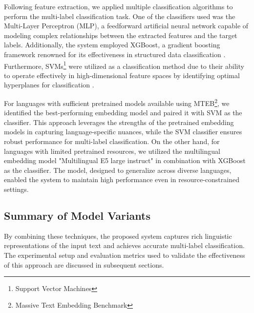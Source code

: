 Following feature extraction, we applied multiple classification algorithms to perform the multi-label classification task. One of the classifiers used was the Multi-Layer Perceptron (MLP), a feedforward artificial neural network capable of modeling complex relationships between the extracted features and the target labels. Additionally, the system employed XGBoost, a gradient boosting framework renowned for its effectiveness in structured data classification \citep{chen2016xgboost}. Furthermore, SVMs\footnote{Support Vector Machines} were utilized as a classification method due to their ability to operate effectively in high-dimensional feature spaces by identifying optimal hyperplanes for classification \citep{cortes1995support}.

For languages with sufficient pretrained models available using MTEB\footnote{Massive Text Embedding Benchmark}\citep{muennighoff2022mteb}, we identified the best-performing embedding model and paired it with SVM as the classifier. This approach leverages the strengths of the pretrained embedding models in capturing language-specific nuances, while the SVM classifier ensures robust performance for multi-label classification. On the other hand, for languages with limited pretrained resources, we utilized the multilingual embedding model "Multilingual E5 large instruct" \citep{wang2024multilingual} in combination with XGBoost as the classifier. The model, designed to generalize across diverse languages, enabled the system to maintain high performance even in resource-constrained settings.

\subsection{Summary of Model Variants}

By combining these techniques, the proposed system captures rich linguistic representations of the input text and achieves accurate multi-label classification. The experimental setup and evaluation metrics used to validate the effectiveness of this approach are discussed in subsequent sections.